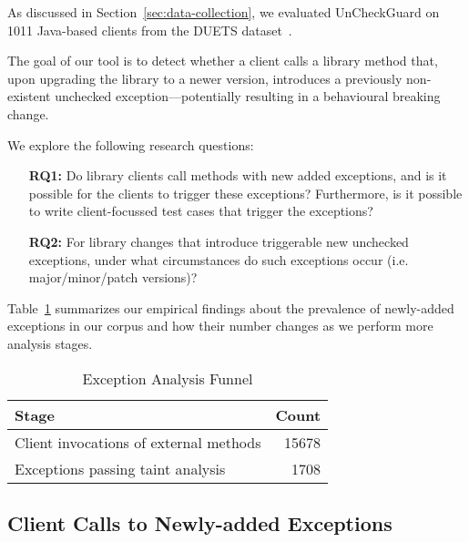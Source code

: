 As discussed in Section~\ref{sec:data-collection}, we evaluated UnCheckGuard on 1011 Java-based clients from the DUETS dataset~\cite{durieux21:_duets}.

The goal of our tool is to detect whether a client calls a library method that, upon upgrading the library to a newer version, introduces a previously non-existent unchecked exception—potentially resulting in a behavioural breaking change.

We explore the following research questions:

\begin{itemize}
  \item[\textbf{RQ1:}] Do library clients call methods with new added exceptions, and is it possible for the clients to trigger these exceptions? Furthermore, is it possible to write client-focussed test cases that trigger the exceptions?
  \item[\textbf{RQ2:}] For library changes that introduce triggerable new unchecked exceptions, under what circumstances do such exceptions occur (i.e. major/minor/patch versions)?
\end{itemize}

Table~\ref{tab:exception-funnel} summarizes our empirical findings about the prevalence of newly-added exceptions in our corpus and how their number changes as we perform more analysis stages.

\begin{table}[h]
\centering
\caption{Exception Analysis Funnel}
\label{tab:exception-funnel}
\begin{tabular}{l r}
\toprule
\textbf{Stage} & \textbf{Count} \\
\midrule
Client invocations of external methods & 15678 \\
Exceptions passing taint analysis & 1708 \\
\bottomrule
\end{tabular}
\end{table}


\subsection{Client Calls to Newly-added Exceptions}

